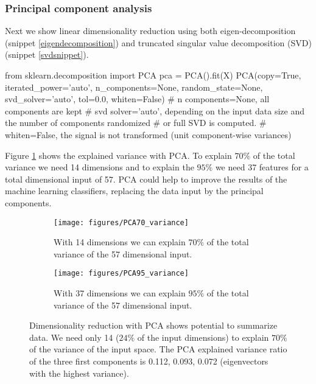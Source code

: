 \documentclass[11pt]{article}
\theoremstyle{definition}
\theoremstyle{remark}
\begin{document}
{\subsubsection{Principal component analysis}
\label{sse:resPCA}
Next we show linear dimensionality reduction using both eigen-decomposition (snippet \ref{eigendecomposition}) and truncated singular value decomposition (SVD) (snippet \ref{svdsnippet}). 

\begin{code}[caption=PCA eigenvectors, label=eigendecomposition]
from sklearn.decomposition import PCA
pca = PCA().fit(X)
PCA(copy=True, iterated_power='auto', n_components=None, random_state=None,
  svd_solver='auto', tol=0.0, whiten=False)
# n components=None, all components are kept
# svd solver='auto', depending on the input data size and the number of components randomized
# or full SVD is computed.
# whiten=False, the signal is not transformed (unit component-wise variances)
\end{code}

Figure \ref{fig:PCA_variance} shows the explained variance with PCA. To explain $70\%$ of the total variance we need 14 dimensions and to explain the $95\%$ we need 37 features for a total dimensional input of 57. PCA could help to improve the results of the machine learning classifiers, replacing the data input by the principal components. 

\begin{figure}[H] 
    \centering
    \begin{subfigure}[t]{.4\columnwidth}
        \centering
        \texttt{[image: figures/PCA70\_variance]}
        \caption{With 14 dimensions we can explain $70\%$ of the total variance of the 57 dimensional input.}
    \end{subfigure}
    \hfill %
    \begin{subfigure}[t]{.4\columnwidth}
        \centering
        \texttt{[image: figures/PCA95\_variance]}
        \caption{With 37 dimensions we can explain $95\%$ of the total variance of the 57 dimensional input.}
    \end{subfigure}%
    \caption{Dimensionality reduction with PCA shows potential to summarize data. We need only 14 ($24\%$ of the input dimensions) to explain  $70\%$ of the variance of the input space. The PCA explained variance ratio of the three first components is 0.112, 0.093, 0.072 (eigenvectors with the highest variance).} \label{fig:PCA_variance}
\end{figure}

}
\end{document}
